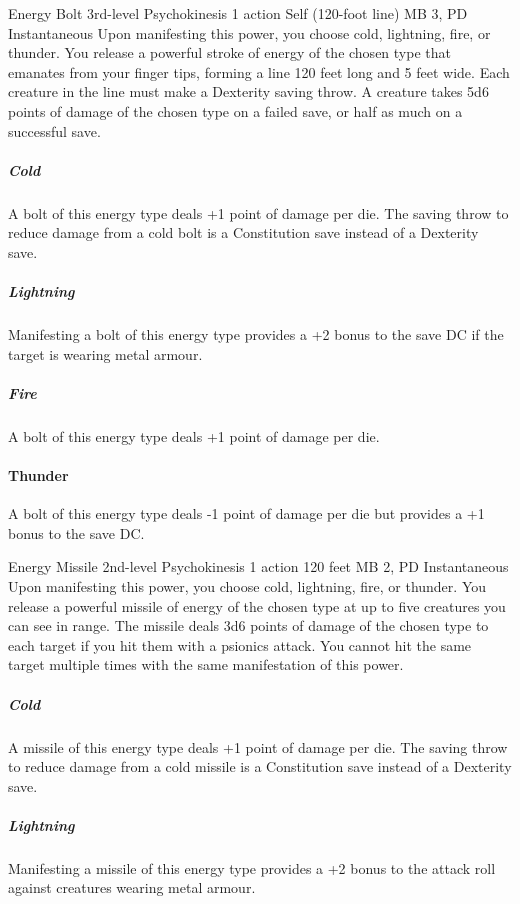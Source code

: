 \DndPowerHeader%
  {Energy Bolt}
  {3rd-level Psychokinesis}
  {1 action}
  {Self (120-foot line)}
  {MB 3, PD \lvlthree}
  {Instantaneous}
  Upon manifesting this power, you choose cold, lightning,
  fire, or thunder.
  You release a powerful stroke of energy of the chosen type
  that emanates from your finger tips,
  forming a line 120 feet long and 5 feet wide.
  Each creature in the line must make a Dexterity saving throw.
  A creature takes 5d6 points of damage of the chosen type
  on a failed save,
  or half as much on a successful save.
  
  \subparagraph{Cold}
  A bolt of this energy type deals +1 point of damage per die.
  The saving throw to reduce damage from a cold bolt
  is a Constitution save instead of a Dexterity save.
  
  \subparagraph{Lightning}
  Manifesting a bolt of this energy type provides
  a +2 bonus to the save DC if the target is wearing metal armour.
  
  \subparagraph{Fire}
  A bolt of this energy type deals +1 point of damage per die.
  
  \paragraph{Thunder}
  A bolt of this energy type deals -1 point of damage per die
  but provides a +1 bonus to the save DC.

\DndPowerHeader%
  {Energy Missile}
  {2nd-level Psychokinesis}
  {1 action}
  {120 feet}
  {MB 2, PD \lvltwo}
  {Instantaneous}
  Upon manifesting this power,
  you choose cold,
  lightning,
  fire,
  or thunder.
  You release a powerful missile of energy
  of the chosen type at up to five creatures you can see in range.
  The missile deals 3d6 points of damage of the chosen type
  to each target if you hit them with a psionics attack.
  You cannot hit the same target multiple times
  with the same manifestation of this power.

  \subparagraph{Cold}
  A missile of this energy type deals +1 point of damage per die.
  The saving throw to reduce damage from a cold missile
  is a Constitution save instead of a Dexterity save.
  
  \subparagraph{Lightning}
  Manifesting a missile of this energy type provides
  a +2 bonus to the attack roll against creatures wearing metal armour.
  

